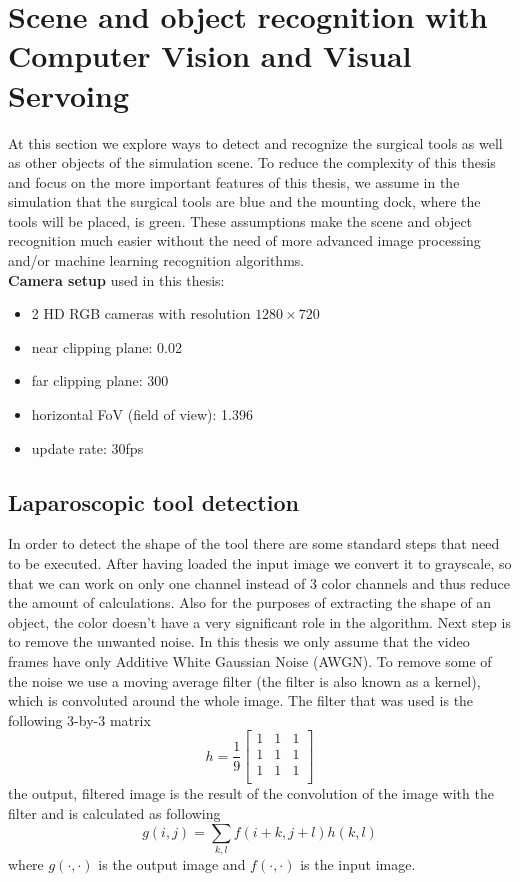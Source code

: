 \section{Scene and object recognition with Computer Vision and Visual Servoing}

At this section we explore ways to detect and recognize the surgical tools as well as other objects of the simulation scene. To reduce the complexity of 
this thesis and focus on the more important features of this thesis, we assume in the simulation that the surgical tools are blue and the mounting dock, 
where the tools will be placed, is green. These assumptions make the scene and object recognition much easier without the need of more advanced image 
processing and/or machine learning recognition algorithms.\\

\textbf{Camera setup} used in this thesis:
\begin{itemize}
\item 2 HD RGB cameras with resolution $1280 \times 720$
\item near clipping plane: 0.02
\item far clipping plane: 300 
\item horizontal FoV (field of view): 1.396
\item update rate: 30fps
\end{itemize}

\subsection{Laparoscopic tool detection}

In order to detect the shape of the tool there are some standard steps that need to be executed. After having loaded the input image we convert it to grayscale, so that we can work on only one channel instead of
3 color channels and thus reduce the amount of calculations. Also for the purposes of extracting the shape of an object, the color doesn't have a very significant role in the algorithm. Next step is 
to remove the unwanted noise. In this thesis we only assume that the video frames have only Additive White Gaussian Noise (AWGN). To remove some of the
noise we use a moving average filter (the filter is also known as a kernel), which is convoluted around the whole image. The filter that was used is the following 3-by-3 matrix
\[
h = \frac{1}{9} \begin{bmatrix}
1 & 1 & 1 \\
1 & 1 & 1 \\
1 & 1 & 1 \\
\end{bmatrix}
\]
the output, filtered image is the result of the convolution of the image with the filter and is calculated as following
\begin{equation}
g(i,j) = \sum_{k,l} f(i+k,j+l)h(k,l)
\end{equation}
where $g(\cdot, \cdot)$ is the output image and $f(\cdot, \cdot)$ is the input image.

